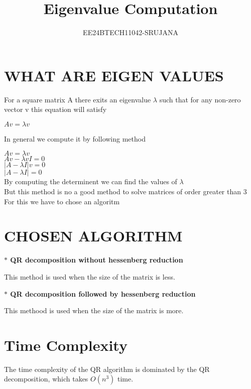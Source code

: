 \documentclass[journal]{IEEEtran}
\begin{document}

\vspace{3cm}
\title{Eigenvalue Computation}
\author{EE24BTECH11042-SRUJANA}
\maketitle
\section{\textbf{WHAT ARE EIGEN VALUES}}\vspace{0.3cm}
For a square matrix A there exits an eigenvalue $ \lambda $ such that for any non-zero vector v this equation will satisfy 
\begin{center}
    $Av=\lambda v$
\end{center}
In general we compute it by following method 
\begin{center}
    $Av=\lambda v$\\
    $Av-\lambda vI=0$\\
    $|A-\lambda I| v=0$\\
    $|A-\lambda I|=0$\\
By computing the determinent we can find the values of $\lambda$\\
But this method is no a good method to solve matrices of order greater than 3\\   
For this we have to chose an algoritm 
\end{center}
\section{\textbf{CHOSEN ALGORITHM}}\vspace{0.3cm}
\begin{center}
     \textbf{$*$ QR decomposition without hessenberg reduction}
\end{center}
 This method is used when the size  of the matrix is less.
\begin{center}
    \textbf{$*$ QR decomposition followed by hessenberg reduction}\vspace{0.3cm}
\end{center}
 This methood is used when the size of the matrix is more.
\section{\textbf{Time Complexity}}
The time complexity of the QR algorithm is dominated by the QR decomposition, which takes \( O(n^3) \) time.
\end{document}
